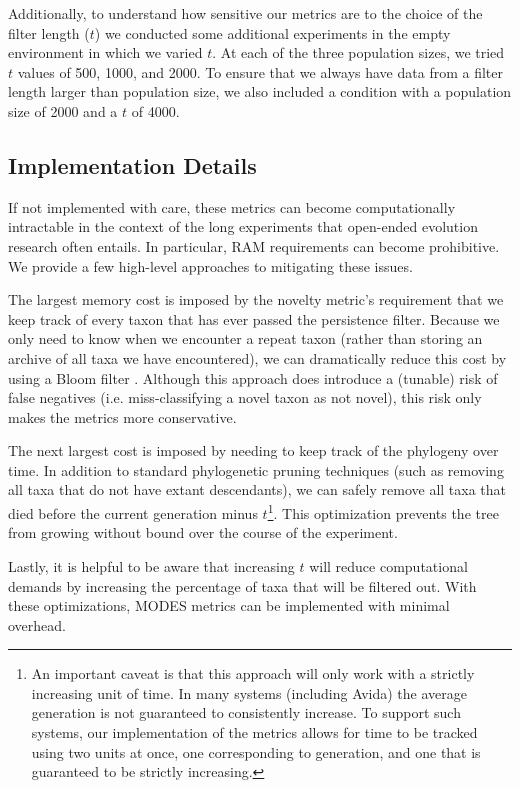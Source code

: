 \documentclass[letterpaper]{article}
\begin{document}
Additionally, to understand how sensitive our metrics are to the choice of the filter length ($t$) we conducted some additional experiments in the empty environment in which we varied $t$. At each of the three population sizes, we tried $t$ values of 500, 1000, and 2000. To ensure that we always have data from a filter length larger than population size, we also included a condition with a population size of 2000 and a $t$ of 4000.

\subsection{Implementation Details}
If not implemented with care, these metrics can become computationally intractable in the context of the long experiments that open-ended evolution research often entails. In particular, RAM requirements can become prohibitive. We provide a few high-level approaches to mitigating these issues.

The largest memory cost is imposed by the novelty metric's requirement that we keep track of every taxon that has ever passed the persistence filter. Because we only need to know when we encounter a repeat taxon (rather than storing an archive of all taxa we have encountered), we can dramatically reduce this cost by using a Bloom filter \citep{Bloom:1970:STH:362686.362692}. Although this approach does introduce a (tunable) risk of false negatives (i.e. miss-classifying a novel taxon as not novel), this risk only makes the metrics more conservative. 

The next largest cost is imposed by needing to keep track of the phylogeny over time. In addition to standard phylogenetic pruning techniques (such as removing all taxa that do not have extant descendants), we can safely remove all taxa that died before the current generation minus $t$\footnote{An important caveat is that this approach will only work with a strictly increasing unit of time. In many systems (including Avida) the average generation is not guaranteed to consistently increase. To support such systems, our implementation of the metrics allows for time to be tracked using two units at once, one corresponding to generation, and one that is guaranteed to be strictly increasing.}. This optimization prevents the tree from growing without bound over the course of the experiment.

Lastly, it is helpful to be aware that increasing $t$ will reduce computational demands by increasing the percentage of taxa that will be filtered out. With these optimizations, MODES metrics can be implemented with minimal overhead.
\end{document}
